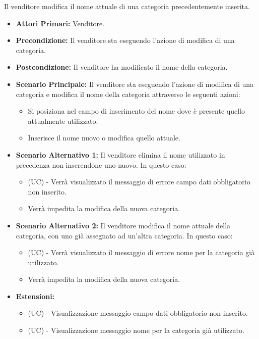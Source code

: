 Il venditore modifica il nome attuale di una categoria precedentemente inserita.
\begin{itemize}
    \item \textbf{Attori Primari:} Venditore.
    \item \textbf{Precondizione:} Il venditore sta eseguendo l'azione di modifica di una categoria.
    \item \textbf{Postcondizione:} Il venditore ha modificato il nome della categoria.
    \item \textbf{Scenario Principale:} Il venditore sta eseguendo l'azione di modifica di una categoria e modifica il nome della categoria attraverso le seguenti azioni:
    \begin{itemize}
        \item Si posiziona nel campo di inserimento del nome dove è presente quello attualmente utilizzato.
        \item Inserisce il nome nuovo o modifica quello attuale.
    \end{itemize}
    \item \textbf{Scenario Alternativo 1:} Il venditore elimina il nome utilizzato in precedenza non inserendone uno nuovo. In questo caso:
    \begin{itemize}
        \item (UC) - Verrà visualizzato il messaggio di errore campo dati obbligatorio non inserito.
        \item Verrà impedita la modifica della nuova categoria.
    \end{itemize}
    \item \textbf{Scenario Alternativo 2:} Il venditore modifica il nome attuale della categoria, con uno già assegnato ad un'altra categoria. In questo caso:
    \begin{itemize}
        \item (UC) - Verrà visualizzato il messaggio di errore nome per la categoria già utilizzato.
        \item Verrà impedita la modifica della nuova categoria.
    \end{itemize}
    \item \textbf{Estensioni:}
    \begin{itemize}
        \item (UC) - Visualizzazione messaggio campo dati obbligatorio non inserito.
        \item (UC) - Visualizzazione messaggio nome per la categoria già utilizzato.
    \end{itemize}
\end{itemize}

